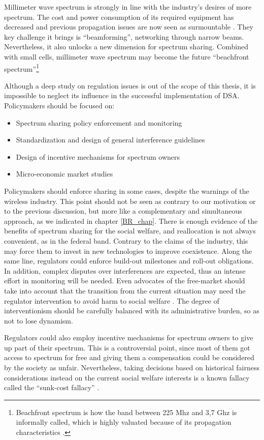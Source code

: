 Millimeter wave spectrum is strongly in line with the industry's desires of more spectrum. The cost and power consumption of its required equipment has decreased and previous propagation issues are now seen as surmountable \cite{ref:Andrews2014}. They key challenge it brings is \enquote{beamforming}, networking through narrow beams. Nevertheless, it also unlocks a new dimension for spectrum sharing. Combined with small cells, millimeter wave spectrum may become the future \enquote{beachfront spectrum}\footnote{Beachfront spectrum is how the band between 225 Mhz and 3,7 Ghz is informally called, which is highly valuated because of its propagation characteristics \cite{AdvisorsonScience}.}

Although a deep study on regulation issues is out of the scope of this thesis, it is impossible to neglect its influence in the successful implementation of DSA. Policymakers should be focused on: 
\begin{itemize}
\item Spectrum sharing policy enforcement and monitoring
\item Standardization and design of general interference guidelines
\item Design of incentive mechanisms for spectrum owners
\item Micro-economic market studies 
\end{itemize} 

Policymakers should enforce sharing in some cases, despite the warnings of the wireless industry. This point should not be seen as contrary to our motivation or to the previous discussion, but more like a complementary and simultaneous approach, as we indicated in chapter \ref{BR_chap}. There is enough evidence of the benefits of  spectrum sharing for the social welfare, and reallocation is not always convenient, as in the federal band. Contrary to the claims of the industry, this may force them to invest in new technologies to improve coexistence. Along the same line, regulators could enforce build-out milestones and roll-out obligations. In addition, complex disputes over interferences are expected, thus an intense effort in monitoring will be needed. Even advocates of the free-market should take into account that the transition from the current situation may need the regulator intervention to avoid harm to social welfare \cite{ref:Yoon2012}. The degree of interventionism should be carefully balanced with its administrative burden, so as not to lose dynamism. 

Regulators could also employ incentive mechanisms for spectrum owners to give up part of their spectrum. This is a controversial point, since most of them got access to spectrum for free and giving them a compensation could be considered by the society as unfair. Nevertheless, taking decisions based on historical fairness considerations instead on the current social welfare interests is a known fallacy called the \enquote{sunk-cost fallacy} \cite[p. 111]{Nuechterlein2013}. 


